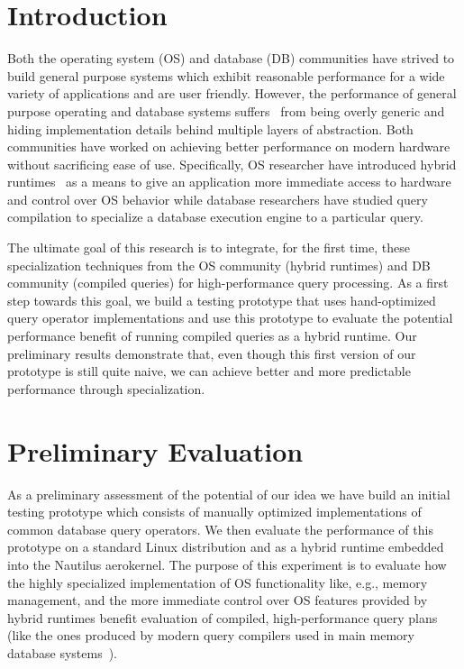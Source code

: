 \documentclass[conference]{IEEEtran}
\begin{document}
\section{Introduction}

  Both the operating system (OS) and database (DB) communities have strived to build general purpose systems which exhibit reasonable performance for a wide variety of applications and are user friendly.
  However, the performance of general purpose operating and database systems suffers~\cite{GICEVA:2016:OS_SUPPORT} from being overly generic and hiding implementation details behind multiple layers of abstraction.
Both communities have worked on achieving better performance on modern hardware without sacrificing ease of use. Specifically, OS researcher have introduced hybrid runtimes~\cite{HALE:2017:MULTIVERSE,HALE:2016:MULTIVERSE,HALE:2015:NAUTILUS,HALE:2016:HRTHVM} as a means to give an application more immediate access to hardware and control over OS behavior while database researchers have studied query compilation to specialize a database execution engine to a particular query.

The ultimate goal of this research is to integrate, for the first time, these specialization techniques from the OS community (hybrid runtimes) and DB community (compiled queries) for high-performance query processing.
As a first step towards this goal, we build a testing prototype that uses hand-optimized query operator implementations and use this prototype to evaluate the potential performance benefit of running compiled queries as a hybrid runtime.
%
Our preliminary results demonstrate that, even though this first version of our prototype is still quite naive, we can achieve better and more predictable performance through specialization.
%





\section{Preliminary Evaluation}

As a preliminary assessment of the potential of our idea we have build an initial testing prototype which consists of manually optimized implementations of common database query operators. We then evaluate the performance of this prototype on a standard Linux distribution and as a hybrid runtime embedded into the Nautilus aerokernel. The purpose of this experiment is to evaluate how the highly specialized implementation of OS functionality like, e.g., memory management, and the more immediate control over OS features provided by hybrid runtimes benefit evaluation of compiled, high-performance query plans (like the ones produced by modern query compilers used in main memory database systems~\cite{N11}). 
\end{document}
